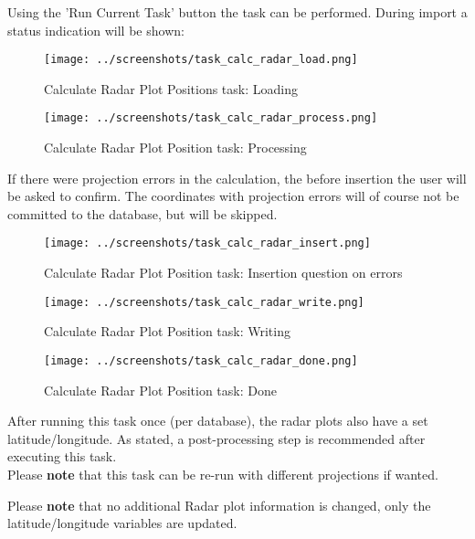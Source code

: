 Using the 'Run Current Task' button the task can be performed. During import a status indication will be shown:

\begin{figure}[H]
  \center
    \texttt{[image: ../screenshots/task\_calc\_radar\_load.png]}
  \caption{Calculate Radar Plot Positions task: Loading}
\end{figure}

\begin{figure}[H]
  \center
    \texttt{[image: ../screenshots/task\_calc\_radar\_process.png]}
  \caption{Calculate Radar Plot Position task: Processing}
\end{figure}

If there were projection errors in the calculation, the before insertion the user will be asked to confirm. The coordinates with projection errors will of course not be committed to the database, but will be skipped.

\begin{figure}[H]
  \center
    \texttt{[image: ../screenshots/task\_calc\_radar\_insert.png]}
  \caption{Calculate Radar Plot Position task: Insertion question on errors}
\end{figure}


\begin{figure}[H]
  \center
    \texttt{[image: ../screenshots/task\_calc\_radar\_write.png]}
  \caption{Calculate Radar Plot Position task: Writing}
\end{figure}

\begin{figure}[H]
  \center
    \texttt{[image: ../screenshots/task\_calc\_radar\_done.png]}
  \caption{Calculate Radar Plot Position task: Done}
\end{figure}

After running this task once (per database), the radar plots also have a set latitude/longitude. As stated, a post-processing step is recommended after executing this task. \\

Please \textbf{note} that this task can be re-run with different projections if wanted.

Please \textbf{note} that no additional Radar plot information is changed, only the latitude/longitude variables are updated. 
